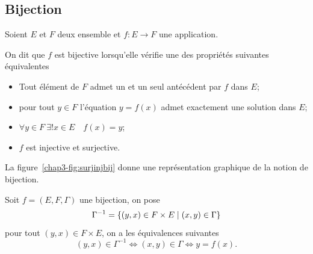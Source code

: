 \subsection{Bijection}
\label{chap3-subsubsec:bijection}
Soient $E$ et $F$ deux ensemble et $f:E \longrightarrow F$ une application.
\begin{defdef}
  On dit que $f$ est bijective lorsqu'elle vérifie une des propriétés suivantes équivalentes
  \begin{itemize}
  \item Tout élément de $F$ admet un et un seul antécédent par $f$ dans $E$;
  \item pour tout $y \in F$ l'équation $y=f(x)$ admet exactement une solution dans $E$;
  \item $\forall y \in F \ \exists! x \in E \quad f(x)=y$;
  \item $f$ est injective et surjective.
  \end{itemize}
La figure~\ref{chap3-fig:surjinjbij} donne une représentation graphique de la notion de bijection.
\end{defdef}
%
Soit $f=(E,F,\Gamma)$ une bijection, on pose 
\begin{equation}
\Gamma^{-1}=\left\{(y,x) \in F \times E\mathrel{}\middle|\mathrel{}(x,y) \in \Gamma\right\}
\end{equation}
pour tout $(y,x) \in F \times E$, on a les équivalences suivantes
\begin{equation}
  (y,x) \in \Gamma^{-1} \iff (x,y) \in \Gamma \iff y=f(x).
\end{equation}

